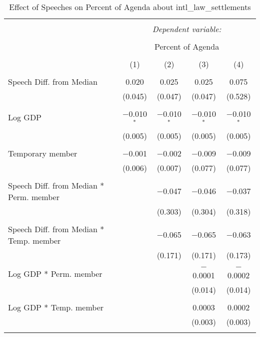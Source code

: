 
\begin{table}[!htbp] \centering 
  \caption{Effect of Speeches on Percent of Agenda about intl_law_settlements} 
  \label{} 
\begin{tabular}{@{\extracolsep{5pt}}lcccc} 
\\[-1.8ex]\hline 
\hline \\[-1.8ex] 
 & \multicolumn{4}{c}{\textit{Dependent variable:}} \\ 
\cline{2-5} 
\\[-1.8ex] & \multicolumn{4}{c}{Percent of Agenda} \\ 
\\[-1.8ex] & (1) & (2) & (3) & (4)\\ 
\hline \\[-1.8ex] 
 Speech Diff. from Median & 0.020 & 0.025 & 0.025 & 0.075 \\ 
  & (0.045) & (0.047) & (0.047) & (0.528) \\ 
  & & & & \\ 
 Log GDP & $-$0.010$^{*}$ & $-$0.010$^{*}$ & $-$0.010$^{*}$ & $-$0.010$^{*}$ \\ 
  & (0.005) & (0.005) & (0.005) & (0.005) \\ 
  & & & & \\ 
 Temporary member & $-$0.001 & $-$0.002 & $-$0.009 & $-$0.009 \\ 
  & (0.006) & (0.007) & (0.077) & (0.077) \\ 
  & & & & \\ 
 Speech Diff. from Median * Perm. member &  & $-$0.047 & $-$0.046 & $-$0.037 \\ 
  &  & (0.303) & (0.304) & (0.318) \\ 
  & & & & \\ 
 Speech Diff. from Median * Temp. member &  & $-$0.065 & $-$0.065 & $-$0.063 \\ 
  &  & (0.171) & (0.171) & (0.173) \\ 
  & & & & \\ 
 Log GDP * Perm. member &  &  & $-$0.0001 & $-$0.0002 \\ 
  &  &  & (0.014) & (0.014) \\ 
  & & & & \\ 
 Log GDP * Temp. member &  &  & 0.0003 & 0.0002 \\ 
  &  &  & (0.003) & (0.003) \\ 
  & & & & \\ 

\end{tabular}
\end{table}

